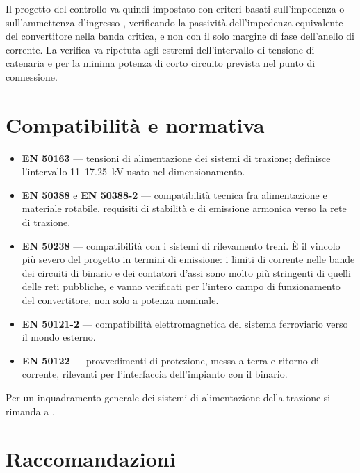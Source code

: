 Il progetto del controllo va quindi impostato con criteri basati sull'impedenza o
sull'ammettenza d'ingresso \cite{sun2011,harnefors2015}, verificando la passività
dell'impedenza equivalente del convertitore nella banda critica, e non con il solo
margine di fase dell'anello di corrente. La verifica va ripetuta agli estremi
dell'intervallo di tensione di catenaria e per la minima potenza di corto circuito
prevista nel punto di connessione.

\section{Compatibilità e normativa}

\begin{itemize}
\item \textbf{EN 50163} \cite{en50163} --- tensioni di alimentazione dei sistemi di
trazione; definisce l'intervallo \SI{11}{}--\SI{17.25}{\kilo\volt} usato nel
dimensionamento.
\item \textbf{EN 50388} e \textbf{EN 50388-2} \cite{en50388,en50388_2} --- compatibilità
tecnica fra alimentazione e materiale rotabile, requisiti di stabilità e di emissione
armonica verso la rete di trazione.
\item \textbf{EN 50238} \cite{en50238} --- compatibilità con i sistemi di rilevamento
treni. È il vincolo più severo del progetto in termini di emissione: i limiti di corrente
nelle bande dei circuiti di binario e dei contatori d'assi sono molto più stringenti di
quelli delle reti pubbliche, e vanno verificati per l'intero campo di funzionamento del
convertitore, non solo a potenza nominale.
\item \textbf{EN 50121-2} \cite{en50121} --- compatibilità elettromagnetica del sistema
ferroviario verso il mondo esterno.
\item \textbf{EN 50122} --- provvedimenti di protezione, messa a terra e ritorno di
corrente, rilevanti per l'interfaccia dell'impianto con il binario.
\end{itemize}

Per un inquadramento generale dei sistemi di alimentazione della trazione si rimanda a
\cite{steimel2008}.

\section{Raccomandazioni}

